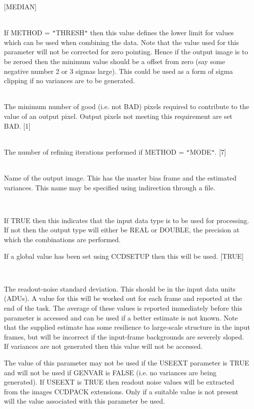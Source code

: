 \documentclass[twoside,11pt]{article}
\newcommand{\htmlref}[2]{#1}
\renewcommand{\_}{\texttt{\symbol{95}}}
\newcommand{\qt}[1]{{\tt "}#1{\tt "}}
\newcommand{\xroutine}[1]{\htmlref{{\sc #1}}{#1}}
\newcommand{\sstsubsection}[1]{ \item[{#1}] \mbox{} \\}
\newcommand{\sstsubsection}[1]{\item[{#1}]}
\begin{document}
{{{{            [MEDIAN]
         }
      }
      \sstsubsection{
         MIN = \_REAL (Read)
      } {
         If METHOD = \qt{THRESH} then this value defines the lower limit
         for values which can be used when combining the data. Note that
         the value used for this parameter will not be corrected for zero
         pointing. Hence if the output image is to be zeroed then the
         minimum value should be a offset from zero (say some negative
         number 2 or 3 sigmas large). This could be used as a form of
         sigma clipping if no variances are to be generated.
      }
      \sstsubsection{
         MINPIX = \_INTEGER (Read)
      } {
         The minimum number of good (i.e. not BAD) pixels required
         to contribute to the value of an output pixel. Output pixels
         not meeting this requirement are set BAD.
         [1]
      }
      \sstsubsection{
         NITER = \_INTEGER (Read)
      } {
         The number of refining iterations performed if METHOD = \qt{MODE}.
         [7]
      }
      \sstsubsection{
         OUT = LITERAL (Read)
      } {
         Name of the output image. This has the master bias frame and
         the estimated variances. This name may be specified using
         indirection through a file.
      }
      \sstsubsection{
         PRESERVE = \_LOGICAL (Read)
      } {
         If TRUE then this indicates that the input data type is to be
         used for processing. If not then the output type will either
         be \_REAL or \_DOUBLE, the precision at which the combinations
         are performed.

         If a global value has been set using \xroutine{CCDSETUP} then this will
         be used.
         [TRUE]
      }
      \sstsubsection{
         RNOISE = \_DOUBLE (Read)
      } {
         The readout-noise standard deviation. This should be in the
         input data units (ADUs). A value for this will be worked out
         for each frame and reported at the end of the task. The
         average of these values is reported immediately before this
         parameter is accessed and can be used if a better estimate is
         not known. Note that the supplied estimate has some resilience
         to large-scale structure in the input frames, but will be
         incorrect if the input-frame backgrounds are severely sloped.
         If variances are not generated then this value will not be
         accessed.

         The value of this parameter may not be used if the USEEXT
         parameter is TRUE and will not be used if GENVAR is FALSE
         (i.e. no variances are being generated). If USEEXT is TRUE
         then readout noise values will be extracted from the images
         CCDPACK extensions. Only if a suitable value is not present
         will the value associated with this parameter be used.

}}}
\end{document}
